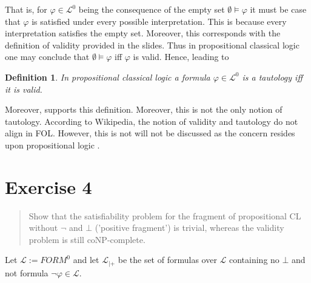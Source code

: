 \documentclass[11pt,a4paper]{article}
\newtheorem{mydef}{Definition}
\begin{document}
That is, for $\varphi \in \mathcal{L}^0$ being the consequence of the empty set $\emptyset \models \varphi$ it must be case that $\varphi$ is satisfied under every possible interpretation. This is because every interpretation satisfies the empty set. Moreover, this corresponds with the definition of validity provided in the slides. Thus in propositional classical logic one may conclude that $\emptyset \models \varphi$ iff $\varphi$ is valid. Hence, leading to

 
\begin{mydef}
In propositional classical logic a formula $\varphi \in \mathcal{L}^0$ is a tautology iff it is valid. 
\end{mydef}

Moreover, \cite{LoCo} supports this definition. Moreover, this is not the only notion of tautology. According to Wikipedia, the notion of validity and tautology do not align in FOL. However, this is not will not be discussed as the concern resides upon propositional logic \cite{wikiT}.

%
%
%
%
%
%
%

\section*{Exercise 4}
\begin{quote}
Show that the satisfiability problem for the fragment of propositional CL without $\neg$ and $\bot$ ('positive fragment') is trivial, whereas the validity problem is still coNP-complete.
\end{quote}


Let $\mathcal{L}:= FORM^0$ and let $\mathcal{L}_{|+}$ be the set of formulas over $\mathcal{L}$ containing no $\bot$ and not formula $\neg \varphi \in \mathcal{L}$.
\end{document}
